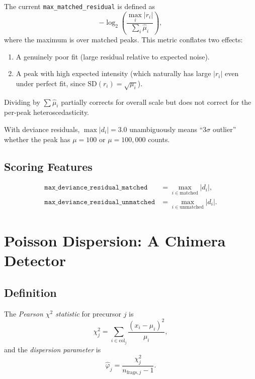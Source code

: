 \documentclass[11pt,a4paper]{article}
\begin{document}
The current \texttt{max\_matched\_residual} is defined as
\[
    -\log_2\!\left(\frac{\max_i |r_i|}{\sum_i \hat{\mu}_i}\right),
\]
where the maximum is over matched peaks. This metric conflates two effects:
\begin{enumerate}[]
    \item A genuinely poor fit (large residual relative to expected noise).
    \item A peak with high expected intensity (which naturally has large $|r_i|$ even
          under perfect fit, since $\text{SD}(r_i) = \sqrt{\mu_i}$).
\end{enumerate}
Dividing by $\sum\hat{\mu}_i$ partially corrects for overall scale but does not correct
for the per-peak heteroscedasticity.

With deviance residuals, $\max|d_i| = 3.0$ unambiguously means ``3$\sigma$ outlier''
whether the peak has $\mu = 100$ or $\mu = 100{,}000$ counts.

\subsection{Scoring Features}

\begin{align}
    \texttt{max\_deviance\_residual\_matched} &= \max_{i \in \text{matched}} |d_i|, \\
    \texttt{max\_deviance\_residual\_unmatched} &= \max_{i \in \text{unmatched}} |d_i|.
\end{align}

\section{Poisson Dispersion: A Chimera Detector}
\label{sec:dispersion}

\subsection{Definition}

The \emph{Pearson $\chi^2$ statistic} for precursor $j$ is
\begin{equation}
    \chi^2_j = \sum_{i \in \text{col}_j} \frac{(x_i - \mu_i)^2}{\mu_i},
    \label{eq:pearson-chi2}
\end{equation}
and the \emph{dispersion parameter} is
\begin{equation}
    \hat{\varphi}_j = \frac{\chi^2_j}{n_{\text{frags},j} - 1}.
    \label{eq:dispersion}
\end{equation}
\end{document}
